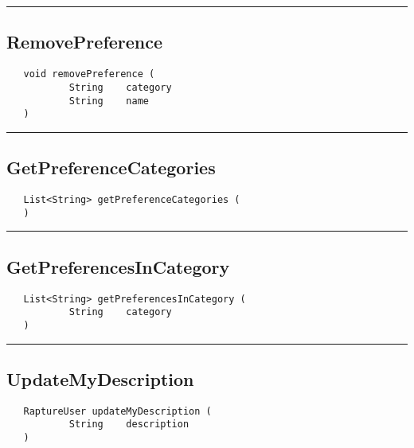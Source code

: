 \rule{15cm}{2pt}
\subsection{RemovePreference}
\label{Api:RemovePreference}
\begin{verbatim}
   void removePreference (
           String    category
           String    name
   )
\end{verbatim}



\rule{15cm}{2pt}
\subsection{GetPreferenceCategories}
\label{Api:GetPreferenceCategories}
\begin{verbatim}
   List<String> getPreferenceCategories (
   )
\end{verbatim}



\rule{15cm}{2pt}
\subsection{GetPreferencesInCategory}
\label{Api:GetPreferencesInCategory}
\begin{verbatim}
   List<String> getPreferencesInCategory (
           String    category
   )
\end{verbatim}



\rule{15cm}{2pt}
\subsection{UpdateMyDescription}
\label{Api:UpdateMyDescription}
\begin{verbatim}
   RaptureUser updateMyDescription (
           String    description
   )
\end{verbatim}



